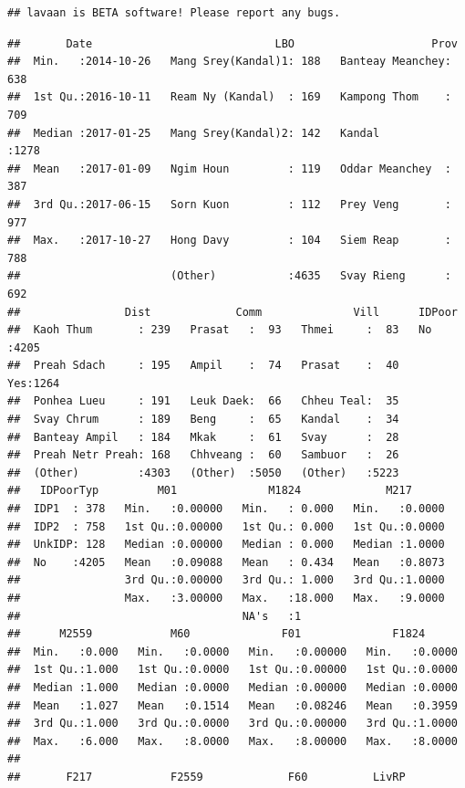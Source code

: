 \documentclass[11pt,]{article}
\begin{document}
\begin{verbatim}
## lavaan is BETA software! Please report any bugs.
\end{verbatim}

\begin{verbatim}
##       Date                            LBO                     Prov     
##  Min.   :2014-10-26   Mang Srey(Kandal)1: 188   Banteay Meanchey: 638  
##  1st Qu.:2016-10-11   Ream Ny (Kandal)  : 169   Kampong Thom    : 709  
##  Median :2017-01-25   Mang Srey(Kandal)2: 142   Kandal          :1278  
##  Mean   :2017-01-09   Ngim Houn         : 119   Oddar Meanchey  : 387  
##  3rd Qu.:2017-06-15   Sorn Kuon         : 112   Prey Veng       : 977  
##  Max.   :2017-10-27   Hong Davy         : 104   Siem Reap       : 788  
##                       (Other)           :4635   Svay Rieng      : 692  
##                Dist             Comm              Vill      IDPoor    
##  Kaoh Thum       : 239   Prasat   :  93   Thmei     :  83   No :4205  
##  Preah Sdach     : 195   Ampil    :  74   Prasat    :  40   Yes:1264  
##  Ponhea Lueu     : 191   Leuk Daek:  66   Chheu Teal:  35             
##  Svay Chrum      : 189   Beng     :  65   Kandal    :  34             
##  Banteay Ampil   : 184   Mkak     :  61   Svay      :  28             
##  Preah Netr Preah: 168   Chhveang :  60   Sambuor   :  26             
##  (Other)         :4303   (Other)  :5050   (Other)   :5223             
##   IDPoorTyp         M01              M1824             M217       
##  IDP1  : 378   Min.   :0.00000   Min.   : 0.000   Min.   :0.0000  
##  IDP2  : 758   1st Qu.:0.00000   1st Qu.: 0.000   1st Qu.:0.0000  
##  UnkIDP: 128   Median :0.00000   Median : 0.000   Median :1.0000  
##  No    :4205   Mean   :0.09088   Mean   : 0.434   Mean   :0.8073  
##                3rd Qu.:0.00000   3rd Qu.: 1.000   3rd Qu.:1.0000  
##                Max.   :3.00000   Max.   :18.000   Max.   :9.0000  
##                                  NA's   :1                        
##      M2559            M60              F01              F1824       
##  Min.   :0.000   Min.   :0.0000   Min.   :0.00000   Min.   :0.0000  
##  1st Qu.:1.000   1st Qu.:0.0000   1st Qu.:0.00000   1st Qu.:0.0000  
##  Median :1.000   Median :0.0000   Median :0.00000   Median :0.0000  
##  Mean   :1.027   Mean   :0.1514   Mean   :0.08246   Mean   :0.3959  
##  3rd Qu.:1.000   3rd Qu.:0.0000   3rd Qu.:0.00000   3rd Qu.:1.0000  
##  Max.   :6.000   Max.   :8.0000   Max.   :8.00000   Max.   :8.0000  
##                                                                     
##       F217            F2559             F60          LivRP     

\end{verbatim}
\end{document}
